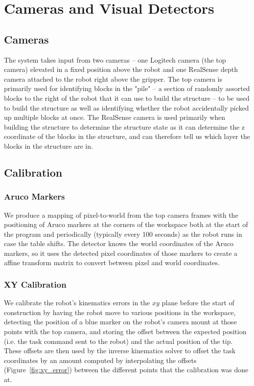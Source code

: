 \section{Cameras and Visual Detectors}
\label{sec:cameras}

\subsection{Cameras}
The system takes input from two cameras -- one Logitech camera (the top camera) elevated in a fixed position above the robot and one RealSense depth camera attached to the robot right above the gripper. The top camera is primarily used for identifying blocks in the "pile" -- a section of randomly assorted blocks to the right of the robot that it can use to build the structure --  to be used to build the structure as well as identifying whether the robot accidentally picked up multiple blocks at once. The RealSense camera is used primarily when building the structure to determine the structure state as it can determine the z coordinate of the blocks in the structure, and can therefore tell us which layer the blocks in the structure are in.

\subsection{Calibration}
\subsubsection{Aruco Markers}
We produce a mapping of pixel-to-world from the top camera frames with the positioning of Aruco markers at the corners of the workspace both at the start of the program and periodically (typically every 100 seconds) as the robot runs in case the table shifts. The detector knows the world coordinates of the Aruco markers, so it uses the detected pixel coordinates of those markers to create a affine transform matrix to convert between pixel and world coordinates.

\subsubsection{XY Calibration}
\label{sec:xy_calib}
We calibrate the robot's kinematics errors in the $xy$ plane before the start of construction by having the robot move to various positions in the workspace, detecting the position of a blue marker on the robot's camera mount at those points with the top camera, and storing the offset between the expected position (i.e. the task command sent to the robot) and the actual position of the tip. These offsets are then used by the inverse kinematics solver to offset the task coordinates by an amount computed by interpolating the offsets (Figure~\ref{fig:xy_error}) between the different points that the calibration was done at.

